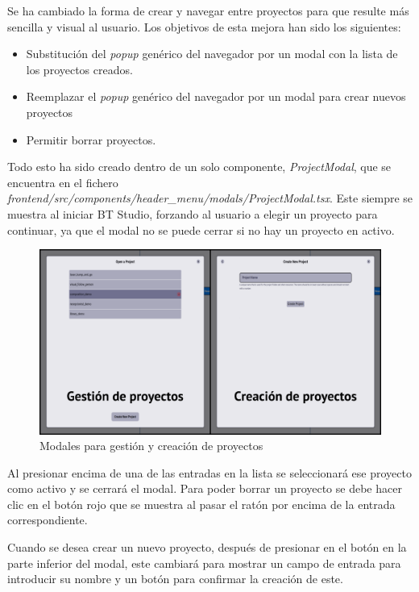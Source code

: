 Se ha cambiado la forma de crear y navegar entre proyectos para que resulte más sencilla y visual al usuario. Los objetivos de esta mejora han sido los siguientes:

\begin{itemize}
    \item Substitución del \textit{popup} genérico del navegador por un modal con la lista de los proyectos creados.
    \item Reemplazar el \textit{popup} genérico del navegador por un modal para crear nuevos proyectos
    \item Permitir borrar proyectos.
\end{itemize}

Todo esto ha sido creado dentro de un solo componente, \textit{ProjectModal}, que se encuentra en el fichero \textit{frontend/src/components/header\_menu/modals/ProjectModal.tsx}. Este siempre se muestra al iniciar BT Studio, forzando al usuario a elegir un proyecto para continuar, ya que el modal no se puede cerrar si no hay un proyecto en activo.

\begin{figure}[H]
    \centering
    \includegraphics[width=\textwidth]{figures/bt-avances/bt-proy-2.png}
    \caption{Modales para gestión y creación de proyectos}
    \label{fig:proy-bar-rec}
\end{figure}

Al presionar encima de una de las entradas en la lista se seleccionará ese proyecto como activo y se cerrará el modal. Para poder borrar un proyecto se debe hacer clic en el botón rojo que se muestra al pasar el ratón por encima de la entrada correspondiente.

Cuando se desea crear un nuevo proyecto, después de presionar en el botón en la parte inferior del modal, este cambiará para mostrar un campo de entrada para introducir su nombre y un botón para confirmar la creación de este. 

